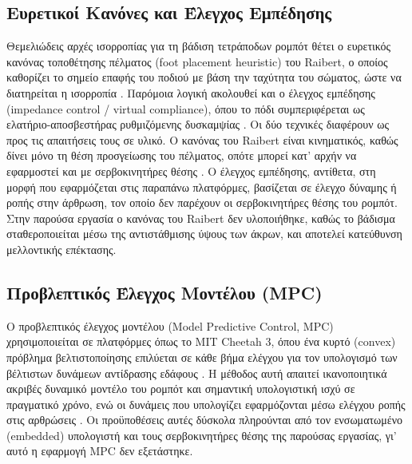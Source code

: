 \documentclass[11pt]{report}
\begin{document}
\subsection{Ευρετικοί Κανόνες και Έλεγχος Εμπέδησης}
Θεμελιώδεις αρχές ισορροπίας για τη βάδιση τετράποδων ρομπότ θέτει ο
ευρετικός κανόνας τοποθέτησης πέλματος (foot placement heuristic) του
Raibert, ο οποίος καθορίζει το σημείο επαφής του ποδιού με βάση την ταχύτητα
του σώματος, ώστε να διατηρείται η ισορροπία \cite{raibert_legged_1986}.
Παρόμοια λογική ακολουθεί και ο έλεγχος εμπέδησης (impedance control /
virtual compliance), όπου το πόδι συμπεριφέρεται ως ελατήριο-αποσβεστήρας
ρυθμιζόμενης δυσκαμψίας \cite{hyun_high_2014,lee_hierarchical_2013}. Οι δύο
τεχνικές διαφέρουν ως προς τις απαιτήσεις τους σε υλικό. Ο κανόνας του Raibert
είναι κινηματικός, καθώς δίνει μόνο τη θέση προσγείωσης του πέλματος, οπότε
μπορεί κατ' αρχήν να εφαρμοστεί και με σερβοκινητήρες θέσης
\cite{raibert_legged_1986}. Ο έλεγχος εμπέδησης, αντίθετα, στη μορφή που
εφαρμόζεται στις παραπάνω πλατφόρμες, βασίζεται σε έλεγχο δύναμης ή ροπής στην
άρθρωση, τον οποίο δεν παρέχουν οι σερβοκινητήρες θέσης του ρομπότ. Στην
παρούσα εργασία ο κανόνας του Raibert δεν υλοποιήθηκε, καθώς το βάδισμα
σταθεροποιείται μέσω της αντιστάθμισης ύψους των άκρων, και αποτελεί
κατεύθυνση μελλοντικής επέκτασης.

\subsection{Προβλεπτικός Έλεγχος Μοντέλου (MPC)}
Ο προβλεπτικός έλεγχος μοντέλου (Model Predictive Control, MPC)
χρησιμοποιείται σε πλατφόρμες όπως το MIT Cheetah 3, όπου ένα κυρτό (convex)
πρόβλημα βελτιστοποίησης επιλύεται σε κάθε βήμα ελέγχου για τον υπολογισμό
των βέλτιστων δυνάμεων αντίδρασης εδάφους \cite{bledt_mit_2018}. Η μέθοδος
αυτή απαιτεί ικανοποιητικά ακριβές δυναμικό μοντέλο του ρομπότ και σημαντική
υπολογιστική ισχύ σε πραγματικό χρόνο, ενώ οι δυνάμεις που υπολογίζει
εφαρμόζονται μέσω ελέγχου ροπής στις αρθρώσεις \cite{bledt_mit_2018}. Οι
προϋποθέσεις αυτές δύσκολα πληρούνται από τον ενσωματωμένο (embedded)
υπολογιστή και τους σερβοκινητήρες θέσης της παρούσας εργασίας, γι' αυτό η
εφαρμογή MPC δεν εξετάστηκε.
\end{document}
